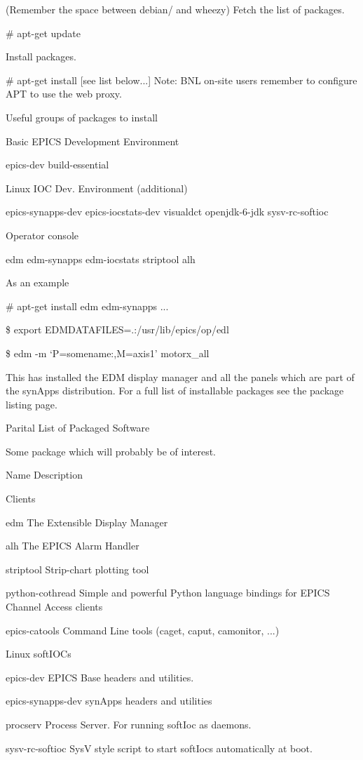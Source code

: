 \documentclass[letterpaper,10pt,english]{sphinxmanual}
\begin{document}
(Remember the space between debian/ and wheezy)
Fetch the list of packages.

\# apt-get update

Install packages.

\# apt-get install {[}see list below...{]}
Note: BNL on-site users remember to configure APT to use the web proxy.

Useful groups of packages to install

Basic EPICS Development Environment

epics-dev build-essential

Linux IOC Dev. Environment (additional)

epics-synapps-dev epics-iocstats-dev visualdct openjdk-6-jdk sysv-rc-softioc

Operator console

edm edm-synapps edm-iocstats striptool alh

As an example

\# apt-get install edm edm-synapps
...

\$ export EDMDATAFILES=.:/usr/lib/epics/op/edl

\$ edm -m `P=somename:,M=axis1' motorx\_all

This has installed the EDM display manager and all the panels which are part of the synApps distribution. For a full list of installable packages see the package listing page.

Parital List of Packaged Software

Some package which will probably be of interest.

Name    Description

Clients

edm     The Extensible Display Manager

alh     The EPICS Alarm Handler

striptool       Strip-chart plotting tool

python-cothread Simple and powerful Python language bindings for EPICS Channel Access clients

epics-catools   Command Line tools (caget, caput, camonitor, ...)

Linux softIOCs

epics-dev       EPICS Base headers and utilities.

epics-synapps-dev       synApps headers and utilities

procserv        Process Server. For running softIoc as daemons.

sysv-rc-softioc SysV style script to start softIocs automatically at boot.
\end{document}
